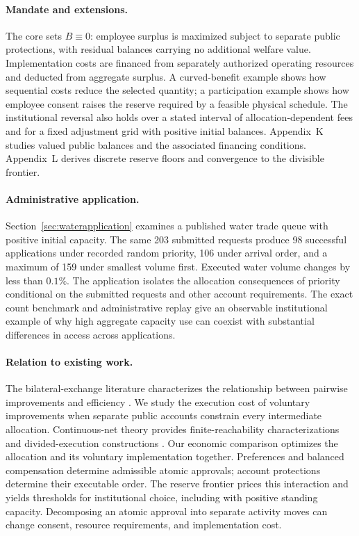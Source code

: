 \documentclass[ecta,draft]{econsocart}
\theoremstyle{definition}
\theoremstyle{definition}
\begin{document}
\paragraph{Mandate and extensions.}
The core sets $B\equiv0$: employee surplus is maximized subject to separate
public protections, with residual balances carrying no additional welfare
value. Implementation costs are financed from separately authorized operating
resources and deducted from aggregate surplus. A curved-benefit example shows
how sequential costs reduce the selected quantity; a participation example
shows how employee consent raises the reserve required by a feasible physical
schedule. The institutional reversal also holds over a stated interval of
allocation-dependent fees and for a fixed adjustment grid with positive
initial balances. Appendix~K%
 studies valued public
balances and the associated financing conditions.
Appendix~L%
 derives discrete reserve floors and
convergence to the divisible frontier.

\paragraph{Administrative application.}
Section~\ref{sec:waterapplication} examines a published water trade queue
with positive initial capacity. The same 203 submitted requests produce 98
successful applications under recorded random priority, 106 under arrival
order, and a maximum of 159 under smallest volume first. Executed water
volume changes by less than $0.1\%$. The application isolates the allocation
consequences of priority conditional on the submitted requests and other
account requirements. The exact count benchmark and administrative replay
give an observable institutional example of why high aggregate capacity use
can coexist with substantial differences in access across applications.

\paragraph{Relation to existing work.}
The bilateral-exchange literature characterizes the relationship between
pairwise improvements and efficiency
\citep{Feldman1973,Madden1978,GoldmanStarr1982,Fisher1989}.
We study the execution cost of voluntary improvements when separate public
accounts constrain every intermediate allocation. Continuous-net theory
provides finite-reachability characterizations and divided-execution
constructions \citep{JulvezRecaldeSilva2003,FracaHaddad2015}.
Our economic comparison optimizes the allocation and its voluntary
implementation together. Preferences and balanced compensation determine
admissible atomic approvals; account protections determine their executable
order. The reserve frontier prices this interaction and yields thresholds
for institutional choice, including with positive standing capacity.
Decomposing an atomic approval into separate activity moves can change
consent, resource requirements, and implementation cost.
\end{document}
